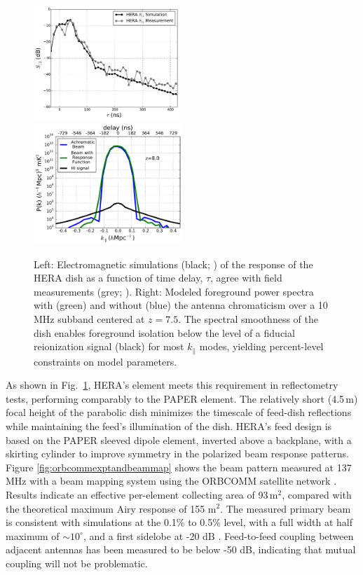 \documentclass[preprint,11pt]{aastex}
\newcommand{\Mycitep}[1]{\citep{#1}}
\begin{document}
\begin{figure}[h!]
	\centering
    \includegraphics[width=0.49\textwidth]{plots/s11_compare_msip.pdf}
\includegraphics[width=0.5\textwidth]{plots/ps1d_with_delay_kernel.pdf}
	\vspace{-25pt}
	\caption{Left: Electromagnetic simulations (black; \citealt{ewallwice_et_al2016}) of the response of the HERA dish as a function of time delay, $\tau$,
       agree with field measurements (grey; \citealt{patra_et_al2016}). 
Right: Modeled foreground power spectra with (green) and without (blue) the antenna chromaticism over a 10\,MHz subband centered at $z=7.5$. The spectral smoothness of the dish enables foreground isolation below the level of a fiducial reionization signal (black) for most $k_{\parallel}$ modes, yielding percent-level constraints on model parameters.}
	\label{fig:reflectometry}
	\vspace{-10pt}
\end{figure}

As shown in Fig.~\ref{fig:reflectometry}, HERA's element meets this requirement in
reflectometry tests, performing comparably to the PAPER element.  The
relatively short (4.5\,m) focal height of the parabolic dish 
minimizes the timescale of feed-dish reflections while maintaining the feed's
illumination of the dish.  HERA's feed design is based on the PAPER sleeved
dipole element, inverted above a backplane, with a skirting cylinder to
improve symmetry in the polarized beam response patterns.  Figure
\ref{fig:orbcommexptandbeammap} shows the beam pattern measured at 137 MHz with a beam mapping
system using the ORBCOMM satellite network \Mycitep{neben_et_al2016}.  Results
indicate an effective per-element collecting area of 93\,m$^2$, compared with the
theoretical maximum Airy response of 155 m$^2$.  The measured primary beam is
consistent with simulations at the 0.1\% to 0.5\% level, with a full width at
half maximum of $\sim$$10^\circ$, and a first sidelobe at -20 dB \citep{ewallwice_et_al2016,neben_et_al2016,patra_et_al2016,thyagarajan_et_al2016}.
Feed-to-feed coupling between adjacent antennas has been measured to be below -50 dB, indicating
that mutual coupling will not be problematic.
\end{document}
